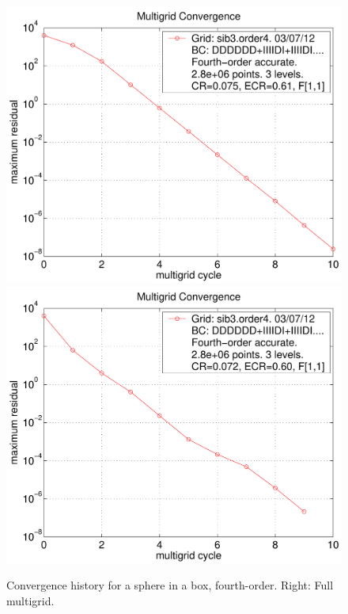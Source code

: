\documentclass{article}
\begin{document}
\renewcommand{\figWidth}{.45\linewidth}
\begin{figure}
\begin{center}
\includegraphics[width=\figWidth]{fig/residual-sib3-order4}
\includegraphics[width=\figWidth]{fig/residual-sib3-order4-fmg}
\end{center}
\caption{Convergence history for a sphere in a box, fourth-order. Right: Full multigrid.}
\label{fig:sib3.order4}
\end{figure}
\end{document}
